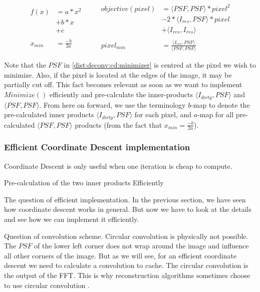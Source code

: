 \begin{equation} \label{dist:deconv:cd:minimizer}
\begin{split}
f(x) & = a*x^2 \\
 & + b*x \\
 & + c\\
 \\
x_{min} & = \frac{-b}{2a}
\end{split}
\quad \quad
\begin{split}
objective(pixel) & = \langle PSF, PSF \rangle * pixel^2 \\
 & - 2*\langle I_{res},PSF\rangle * pixel \\
 &+ \langle I_{res}, I_{res} \rangle\\
 \\
pixel_{min} & = \frac{\langle I_{res},PSF\rangle}{\langle PSF, PSF \rangle}
\end{split}
\end{equation}

Note that the $PSF$ in \eqref{dist:deconv:cd:minimizer} is centred at the pixel we wish to minimize. Also, if the pixel is located at the edges of the image, it may be partially cut off. This fact becomes relevant as soon as we want to implement $Minimize()$ efficiently and pre-calculate the inner-products $\langle I_{dirty},PSF\rangle$ and $\langle PSF, PSF \rangle$. From here on forward, we use the terminology $b$-map to denote the pre-calculated inner products $\langle I_{dirty},PSF\rangle$ for each pixel, and $a$-map for all pre-calculated $\langle PSF, PSF \rangle$ products (from the fact that $x_{min} = \frac{-b}{2a}$). 


\subsubsection{Efficient Coordinate Descent implementation}\label{dist:deconv:efficient}
Coordinate Descent is only useful when one iteration is cheap to compute.

Pre-calculation of the two inner products
Efficiently



The question of efficient implementation. In the previous section, we have seen how coordinate descent works in general. But now we have to look at the details and see how we can implement it efficiently.

Question of convolution scheme. 
Circular convolution is physically not possible. The $PSF$ of the lower left corner does not wrap around the image and influence all other corners of the image. But as we will see, for an efficient coordinate descent we need to calculate a convolution to cache. The circular convolution is the output of the FFT. This is why reconstruction algorithms sometimes choose to use circular convolution \cite{ferrari2014distributed}.

